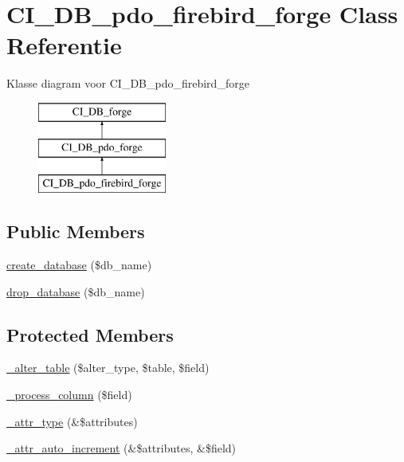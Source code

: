 \hypertarget{class_c_i___d_b__pdo__firebird__forge}{}\section{C\+I\+\_\+\+D\+B\+\_\+pdo\+\_\+firebird\+\_\+forge Class Referentie}
\label{class_c_i___d_b__pdo__firebird__forge}
Klasse diagram voor C\+I\+\_\+\+D\+B\+\_\+pdo\+\_\+firebird\+\_\+forge\begin{figure}[H]
\begin{center}
\leavevmode
\includegraphics[height=3.000000cm]{class_c_i___d_b__pdo__firebird__forge}
\end{center}
\end{figure}
\subsection*{Public Members}
\begin{DoxyCompactItemize}
\item 
\mbox{\hyperlink{class_c_i___d_b__pdo__firebird__forge_a902a7267babceb2ce595706f217e00ad}{create\+\_\+database}} (\$db\+\_\+name)
\item 
\mbox{\hyperlink{class_c_i___d_b__pdo__firebird__forge_a9612987b2d4230de2638d15857e92e67}{drop\+\_\+database}} (\$db\+\_\+name)
\end{DoxyCompactItemize}
\subsection*{Protected Members}
\begin{DoxyCompactItemize}
\item 
\mbox{\hyperlink{class_c_i___d_b__pdo__firebird__forge_a41c6cae02f2fda8b429ad0afb9509426}{\+\_\+alter\+\_\+table}} (\$alter\+\_\+type, \$table, \$field)
\item 
\mbox{\hyperlink{class_c_i___d_b__pdo__firebird__forge_a8f38f1c5b5dddecca4befbe393f3f299}{\+\_\+process\+\_\+column}} (\$field)
\item 
\mbox{\hyperlink{class_c_i___d_b__pdo__firebird__forge_a8553be952084c6f7cdfff370a1d14f6b}{\+\_\+attr\+\_\+type}} (\&\$attributes)
\item 
\mbox{\hyperlink{class_c_i___d_b__pdo__firebird__forge_a2a013a5932439c3c44f0dad3436525f7}{\+\_\+attr\+\_\+auto\+\_\+increment}} (\&\$attributes, \&\$field)
\end{DoxyCompactItemize}

